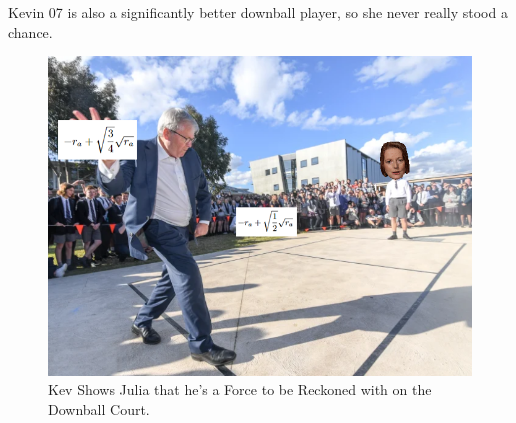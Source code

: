 \documentclass{article}
\begin{document}
\newpage
\vspace*{\fill}
\centering
Kevin 07 is also a significantly better downball player, so she never really stood a chance.
\begin{figure}[hb]
    \centering
    \includegraphics[width=0.75\linewidth]{handball}
    \caption{Kev Shows Julia that he's a Force to be Reckoned with on the Downball Court.}
    \label{fig:handball}
\end{figure}
\vspace*{\fill}
\end{document}
